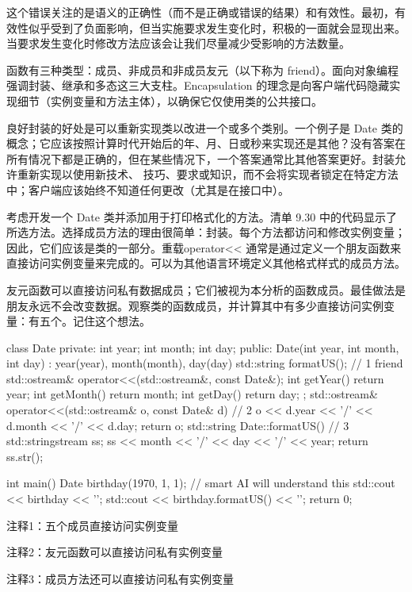 这个错误关注的是语义的正确性（而不是正确或错误的结果）和有效性。最初，有效性似乎受到了负面影响，但当实施要求发生变化时，积极的一面就会显现出来。当要求发生变化时修改方法应该会让我们尽量减少受影响的方法数量。

函数有三种类型：成员、非成员和非成员友元（以下称为 friend）。面向对象编程强调封装、继承和多态这三大支柱。Encapsulation 的理念是向客户端代码隐藏实现细节（实例变量和方法主体），以确保它仅使用类的公共接口。

良好封装的好处是可以重新实现类以改进一个或多个类别。一个例子是 Date 类的概念；它应该按照计算时代开始后的年、月、日或秒来实现还是其他？没有答案在所有情况下都是正确的，但在某些情况下，一个答案通常比其他答案更好。封装允许重新实现以使用新技术、 技巧、要求或知识，而不会将实现者锁定在特定方法中；客户端应该始终不知道任何更改（尤其是在接口中）。


考虑开发一个 Date 类并添加用于打印格式化的方法。清单 9.30 中的代码显示了所选方法。选择成员方法的理由很简单：封装。每个方法都访问和修改实例变量；因此，它们应该是类的一部分。重载operator<{}< 通常是通过定义一个朋友函数来直接访问实例变量来完成的。可以为其他语言环境定义其他格式样式的成员方法。

友元函数可以直接访问私有数据成员；它们被视为本分析的函数成员。最佳做法是朋友永远不会改变数据。观察类的函数成员，并计算其中有多少直接访问实例变量：有五个。记住这个想法。


\begin{cpp}
class Date {
private:
  int year;
  int month;
  int day;
public:
  Date(int year, int month, int day) : year(year), month(month), day(day) {}
  std::string formatUS(); // 1
  friend std::ostream& operator<<(std::ostream&, const Date&);
  int getYear() { return year; }
  int getMonth() { return month; }
  int getDay() { return day; }
};
std::ostream& operator<<(std::ostream& o, const Date& d) { // 2
  o << d.year << '/' << d.month << '/' << d.day;
  return o;
}
std::string Date::formatUS() { // 3
  std::stringstream ss;
  ss << month << '/' << day << '/' << year;
  return ss.str();
}

int main() {
  Date birthday(1970, 1, 1); // smart AI will understand this
  std::cout << birthday << '\n';
  std::cout << birthday.formatUS() << '\n';
  return 0;
}
\end{cpp}

{\footnotesize
注释1：五个成员直接访问实例变量

注释2：友元函数可以直接访问私有实例变量

注释3：成员方法还可以直接访问私有实例变量
}


